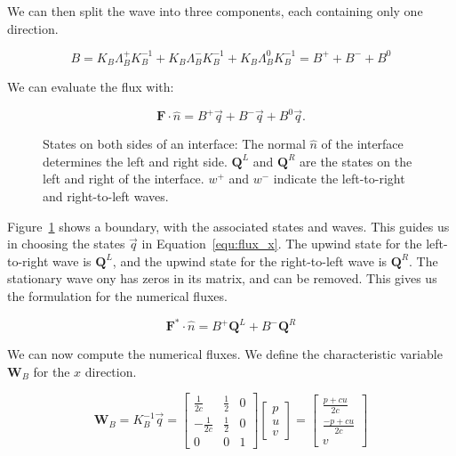 We can then split the wave into three components, each containing only one direction.

\begin{equation}
	B = K_B \Lambda_B^+ K_B^{-1} + K_B \Lambda_B^- K_B^{-1} + K_B \Lambda_B^0 K_B^{-1} = B^+ + B^- + B^0
\end{equation}

We can evaluate the flux with:

\begin{equation} \label{equ:flux_x}
	\mathbf{F} \cdot \widehat{n} = B^+\overrightarrow{q} + B^-\overrightarrow{q} + B^0 \overrightarrow{q}.
\end{equation}

\begin{figure}[H]
	\centering
	
	\caption{States on both sides of an interface: The normal $\widehat{n}$ of the interface
	    determines the left and right side. $\mathbf{Q}^L$ and $\mathbf{Q}^R$ are the states on the
	    left and right of the interface. $w^+$ and $w^-$ indicate the left-to-right and
	    right-to-left waves.}
	\label{fig:waves}
\end{figure}

Figure~\ref{fig:waves} shows a boundary, with the associated states and waves. This guides us in
choosing the states $\overrightarrow{q}$ in Equation~\ref{equ:flux_x}. The upwind state for the
left-to-right wave is $\mathbf{Q}^L$, and the upwind state for the right-to-left wave is
$\mathbf{Q}^R$. The stationary wave ony has zeros in its matrix, and can be removed. This gives us
the formulation for the numerical fluxes.

\begin{equation} \label{equ:flux_x_states}
	\mathbf{F}^* \cdot \widehat{n} = B^+ \mathbf{Q}^L + B^- \mathbf{Q}^R
\end{equation}

We can now compute the numerical fluxes. We define the characteristic variable $\mathbf{W}_B$ for
the $x$ direction.

\begin{equation}
	\mathbf{W}_B = K_B^{-1} \overrightarrow{q} = 
    \begin{bmatrix}
        \frac{1}{2 c} & \frac{1}{2} & 0 \\ 
        -\frac{1}{2 c} & \frac{1}{2} & 0 \\ 
        0 & 0 & 1
	\end{bmatrix}
	\begin{bmatrix}
        p \\ 
        u \\ 
        v
	\end{bmatrix} = 
	\begin{bmatrix}
        \frac{p + c u}{2 c} \\ 
        \frac{-p + c u}{2 c} \\ 
        v
	\end{bmatrix}
\end{equation}

